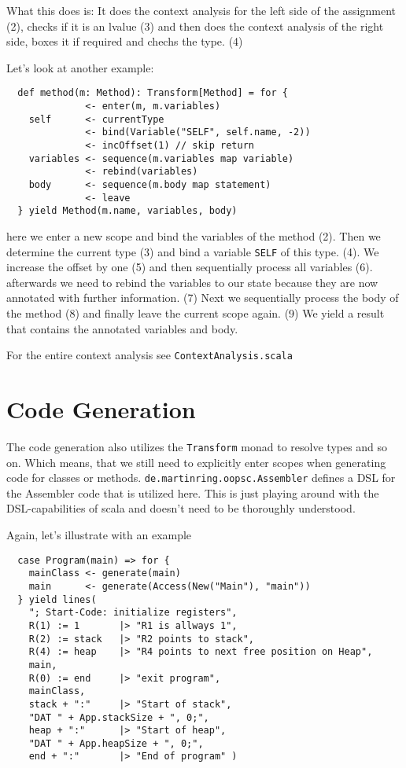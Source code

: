 \documentclass{style}
\begin{document}
What this does is: It does the context analysis for the left side of the assignment (2), checks if it is an lvalue (3) and then does the context analysis of the right side, boxes it if required and chechs the type. (4)

Let's look at another example:

\begin{lstlisting}
  def method(m: Method): Transform[Method] = for {
              <- enter(m, m.variables)    
    self      <- currentType
              <- bind(Variable("SELF", self.name, -2))
              <- incOffset(1) // skip return
    variables <- sequence(m.variables map variable)
              <- rebind(variables)
    body      <- sequence(m.body map statement)
              <- leave
  } yield Method(m.name, variables, body)
\end{lstlisting}

here we enter a new scope and bind the variables of the method (2). Then we determine the current type (3) and bind a variable \texttt{SELF} of this type. (4). We increase the offset by one (5) and then sequentially process all variables (6). afterwards we need to rebind the variables to our state because they are now annotated with further information. (7) Next we sequentially process the body of the method (8) and finally leave the current scope again. (9) We yield a result that contains the annotated variables and body.

For the entire context analysis see \texttt{ContextAnalysis.scala}

\section{Code Generation}

The code generation also utilizes the \texttt{Transform} monad to resolve types and so on. Which means, that we still need to explicitly enter scopes when generating code for classes or methods. \texttt{de.martinring.oopsc.Assembler} defines a DSL for the Assembler code that is utilized here. This is just playing around with the DSL-capabilities of scala and doesn't need to be thoroughly understood.

Again, let's illustrate with an example

\begin{lstlisting}
  case Program(main) => for {
    mainClass <- generate(main)
    main      <- generate(Access(New("Main"), "main"))      
  } yield lines(
    "; Start-Code: initialize registers",
    R(1) := 1       |> "R1 is allways 1",
    R(2) := stack   |> "R2 points to stack",
    R(4) := heap    |> "R4 points to next free position on Heap",
    main,
    R(0) := end     |> "exit program",
    mainClass,
    stack + ":"     |> "Start of stack",
    "DAT " + App.stackSize + ", 0;",
    heap + ":"      |> "Start of heap",
    "DAT " + App.heapSize + ", 0;",
    end + ":"       |> "End of program" )
\end{lstlisting}
\end{document}
